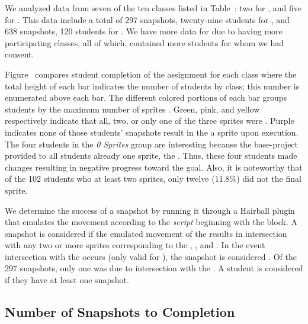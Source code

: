 We analyzed data from seven of the ten classes listed in
Table~: two for \sone{}, and five for \stwo{}. This
data include a total of 297 snapshots, twenty-nine students for \sone{}, and
638 snapshots, 120 students for \stwo{}. We have more data for \stwo{} due to
having more participating classes, all of which, contained more students for
whom we had consent.

Figure~ compares student completion of the
assignment for each class where the total height of each bar indicates the
number of students by class; this number is enumerated above each bar. The
different colored portions of each bar groups students by the maximum number of
sprites \caught{}. Green, pink, and yellow respectively indicate that all, two,
or only one of the three sprites were \caught{}. Purple indicates none of those
students' snapshots result in the \net{}  a sprite upon
execution. The four students in the \emph{0 Sprites} group are interesting
because the base-project provided to all students already  one
sprite, the \zebra{}. Thus, these four students made changes resulting in
negative progress toward the goal. Also, it is noteworthy that of the 102
students who \caught{} at least two sprites, only twelve (11.8\%) did not
\catch{} the final sprite.

We determine the success of a snapshot by running it through a Hairball plugin
that emulates the  movement according to the \net{} \emph{script}
beginning with the \netclicked{} block. A snapshot is considered \com{} if the
emulated movement of the \net{} results in intersection with any two or more
sprites corresponding to the \bear{}, \horse{}, and \zebra{}. In the event
intersection with the \snake{} occurs (only valid for \sone{}), the snapshot is
considered \incom{}. Of the 297 \sone{} snapshots, only one was \incom{} due to
intersection with the \snake{}. A student is considered \com{} if they have at
least one \com{} snapshot.

\subsection{Number of Snapshots to Completion}


